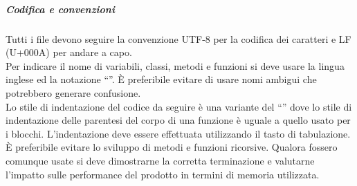 \documentclass[../NormeDiProgetto.tex]{subfiles}
\begin{document}
				\subparagraph{Codifica e convenzioni\\}
					Tutti i file devono seguire la convenzione UTF-8 per la codifica dei caratteri e
					LF (U+000A) per andare a capo.\\
					Per indicare il nome di variabili, classi, metodi e funzioni si deve usare la lingua
					inglese ed la notazione ``''. È preferibile evitare di usare nomi ambigui che
					potrebbero generare confusione.\\
					Lo stile di indentazione del codice da seguire è una variante del ``'' dove lo stile
					di indentazione delle parentesi del corpo di una funzione è uguale a quello usato per
					i blocchi. L'indentazione deve essere effettuata utilizzando il tasto di tabulazione.\\
					È preferibile evitare lo sviluppo di metodi e funzioni ricorsive. Qualora fossero
					comunque usate si deve dimostrarne la corretta terminazione e valutarne l'impatto sulle
					performance del prodotto in termini di memoria utilizzata.\\
\end{document}
